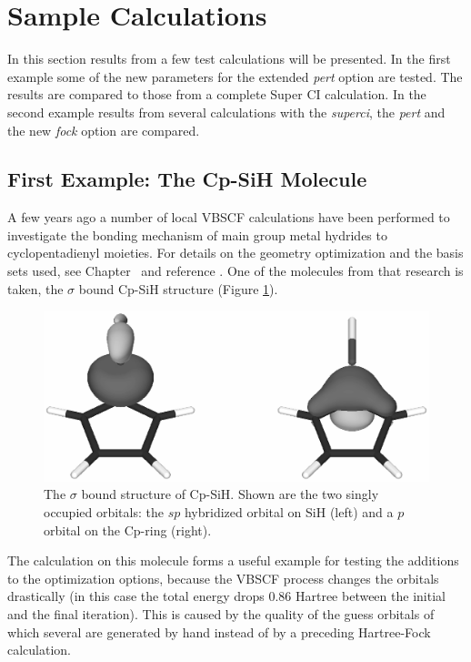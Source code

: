 \section{Sample Calculations}

In this section results from a few test calculations will be presented. In the first example some of the new parameters for the extended \textit{pert} option are tested. The results are compared to those from a complete Super CI calculation. In the second example results from several calculations with the \textit{superci}, the \textit{pert} and the new \textit{fock} option are compared.  

\subsection{\label{ch2.sec.cyclopent}First Example: The Cp-SiH Molecule}

A few years ago a number of local VBSCF calculations have been performed to investigate the bonding mechanism of main group metal hydrides to cyclopentadienyl moieties. For details on the geometry optimization and the basis sets used, see Chapter \chcyclopentadienyl\ and reference \cite{budzelaar}. One of the molecules from that research is taken, the $\sigma$ bound \mbox{Cp-SiH} structure (Figure \ref{fig.cpsih}).
\begin{figure}[htdp]
\center
\includegraphics[scale=0.6]{orbopt/figures/sigma_sih.eps}
\caption{The $\sigma$ bound structure of Cp-SiH. Shown are the two singly occupied orbitals: the $sp$ hybridized orbital on SiH (left) and a $p$ orbital on the Cp-ring (right).}
\label{fig.cpsih}
\end{figure}
The calculation on this molecule forms a useful example for testing the additions to the optimization options, because the VBSCF process changes the orbitals drastically (in this case the total energy drops 0.86 Hartree between the initial and the final iteration). This is caused by the quality of the guess orbitals of which several are generated by hand instead of by a preceding Hartree-Fock calculation.

